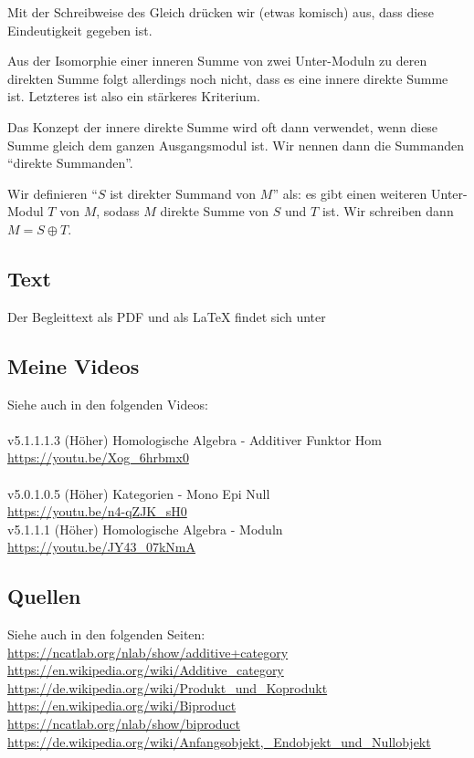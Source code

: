 \documentclass[a4paper]{amsart}
\theoremstyle{definition}
\begin{document}
Mit der Schreibweise des Gleich drücken wir (etwas komisch) aus, dass diese Eindeutigkeit gegeben ist.

Aus der Isomorphie einer inneren Summe von zwei Unter-Moduln zu deren direkten Summe folgt allerdings noch nicht, dass es eine innere direkte Summe ist. Letzteres ist also ein stärkeres Kriterium.

Das Konzept der innere direkte Summe wird oft dann verwendet, wenn diese Summe gleich dem ganzen Ausgangsmodul ist. Wir nennen dann die Summanden "`direkte Summanden"'. 

Wir definieren "`$S$ ist direkter Summand von $M$"' als: es gibt einen weiteren Unter-Modul $T$ von $M$, sodass $M$ direkte Summe von $S$ und $T$ ist. Wir schreiben dann $M = S \oplus T$. 


\subsection*{Text}
Der Begleittext als PDF und als LaTeX findet sich unter
{\tiny
   \url{}
}

\subsection*{Meine Videos}
Siehe auch in den folgenden Videos:\\
\\
v5.1.1.1.3 (Höher) Homologische Algebra - Additiver Funktor Hom\\
\url{https://youtu.be/Xog_6hrbmx0}\\
\\
v5.0.1.0.5 (Höher) Kategorien - Mono Epi Null\\
\url{https://youtu.be/n4-qZJK_sH0}
\\
v5.1.1.1 (Höher) Homologische Algebra - Moduln\\
\url{https://youtu.be/JY43_07kNmA}\\

\subsection*{Quellen}
Siehe auch in den folgenden Seiten:\\
\url{https://ncatlab.org/nlab/show/additive+category}\\
\url{https://en.wikipedia.org/wiki/Additive_category}\\
\url{https://de.wikipedia.org/wiki/Produkt_und_Koprodukt}\\
\url{https://en.wikipedia.org/wiki/Biproduct}\\
\url{https://ncatlab.org/nlab/show/biproduct}\\
\url{https://de.wikipedia.org/wiki/Anfangsobjekt,_Endobjekt_und_Nullobjekt}
\end{document}

